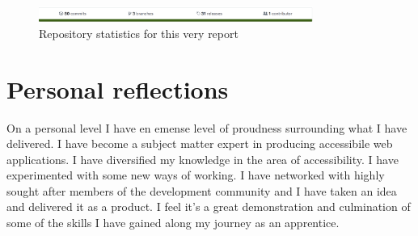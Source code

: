 \begin{figure}[H]
\centering
\includegraphics[width=0.8\textwidth]{figures/ghub}
\captionsetup{justification=centering}
\caption{Repository statistics for this very report
\label{fig:ghub}}
\end{figure}

\section{Personal reflections}
On a personal level I have en emense level of proudness surrounding what I
have delivered. I have become a subject matter expert in producing
accessibile web applications. I have diversified my knowledge in the area of
accessibility. I have experimented with some new ways of working. I have
networked with highly sought after members of the development community and I
have taken an idea and delivered it as a product. I feel it's a great
demonstration and culmination of some of the skills I have gained along my
journey as an apprentice.
